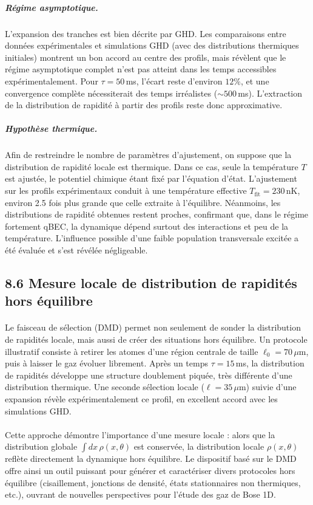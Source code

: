 \subparagraph{Régime asymptotique.}  
L’expansion des tranches est bien décrite par \gls{GHD}. Les comparaisons entre données expérimentales et simulations \gls{GHD} (avec des distributions thermiques initiales) montrent un bon accord au centre des profils, mais révèlent que le régime asymptotique complet n’est pas atteint dans les temps accessibles expérimentalement. Pour $\tau=50$\,ms, l’écart reste d’environ $12\%$, et une convergence complète nécessiterait des temps irréalistes ($\sim 500$\,ms). L’extraction de la distribution de rapidité à partir des profils reste donc approximative.

\subparagraph{Hypothèse thermique.}  
Afin de restreindre le nombre de paramètres d’ajustement, on suppose que la distribution de rapidité locale est thermique. Dans ce cas, seule la température $T$ est ajustée, le potentiel chimique étant fixé par l’équation d’état. L’ajustement sur les profils expérimentaux conduit à une température effective $T_{\text{fit}}=230$\,nK, environ 2.5 fois plus grande que celle extraite à l’équilibre. Néanmoins, les distributions de rapidité obtenues restent proches, confirmant que, dans le régime fortement \gls{qBEC}, la dynamique dépend surtout des interactions et peu de la température. L’influence possible d’une faible population transversale excitée a été évaluée et s’est révélée négligeable.

\subsection*{8.6 Mesure locale de distribution de rapidités hors équilibre}

\paragraph{}  
Le faisceau de sélection (\gls{DMD}) permet non seulement de sonder la distribution de rapidités locale, mais aussi de créer des situations hors équilibre. Un protocole illustratif consiste à retirer les atomes d’une région centrale de taille $\ell_0 = 70\,\mu$m, puis à laisser le gaz évoluer librement. Après un temps $\tau = 15$\,ms, la distribution de rapidités développe une structure doublement piquée, très différente d’une distribution thermique. Une seconde sélection locale ($\ell=35\,\mu$m) suivie d’une expansion révèle expérimentalement ce profil, en excellent accord avec les simulations GHD.

\paragraph{}  
Cette approche démontre l’importance d’une mesure locale : alors que la distribution globale $\int dx\,\rho(x,\theta)$ est conservée, la distribution locale $\rho(x,\theta)$ reflète directement la dynamique hors équilibre. Le dispositif basé sur le \gls{DMD} offre ainsi un outil puissant pour générer et caractériser divers protocoles hors équilibre (cisaillement, jonctions de densité, états stationnaires non thermiques, etc.), ouvrant de nouvelles perspectives pour l’étude des gaz de Bose 1D.


